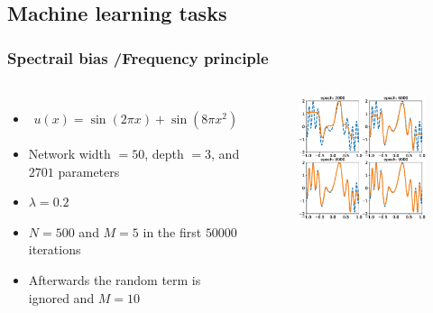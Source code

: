 \documentclass[aspectratio=169]{beamer}
\begin{document}
\subsection{Machine learning tasks}
\begin{frame}
\frametitle{Spectrail bias \cite{Rahaman2018}/Frequency principle \cite{xu2019frequency}}

	\begin{columns}
	
	\begin{itemize}
		\item[] \begin{align*}
		u(x) = \sin(2\pi x) + \sin(8 \pi x ^2)
		\end{align*}
		\item Network width $ = 50$, depth $ = 3$, and $2701$ parameters 
		\item $\lambda=0.2$
		\item $N = 500$ and $M=5$ in the first $50000$ iterations
		\item Afterwards the random term is ignored and $M = 10$
	\end{itemize}
	
	\begin{figure}[ht]
		\centering
		\includegraphics[width=0.7\linewidth]{Figure//Fprinciple_exm1}
	\end{figure}	
	\end{columns}

\end{frame}
\end{document}

